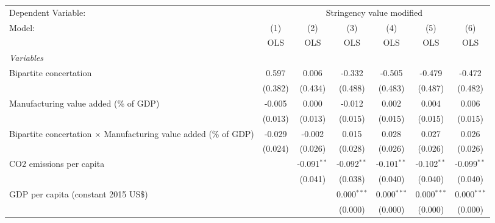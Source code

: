 
\begingroup
\centering
\begin{tabular}{lcccccc}
   \toprule
   Dependent Variable: & \multicolumn{6}{c}{Stringency value modified}\\
   Model:                                                                  & (1)     & (2)           & (3)           & (4)            & (5)            & (6)\\  
                                                                           &  OLS    & OLS           & OLS           & OLS            & OLS            & OLS\\  
   \midrule
   \emph{Variables}\\
   Bipartite concertation                                                  & 0.597   & 0.006         & -0.332        & -0.505         & -0.479         & -0.472\\   
                                                                           & (0.382) & (0.434)       & (0.488)       & (0.483)        & (0.487)        & (0.482)\\   
   Manufacturing value added (\% of GDP)                                   & -0.005  & 0.000         & -0.012        & 0.002          & 0.004          & 0.006\\   
                                                                           & (0.013) & (0.013)       & (0.015)       & (0.015)        & (0.015)        & (0.015)\\   
   Bipartite concertation $\times$ Manufacturing value added (\% of GDP)   & -0.029  & -0.002        & 0.015         & 0.028          & 0.027          & 0.026\\   
                                                                           & (0.024) & (0.026)       & (0.028)       & (0.026)        & (0.026)        & (0.026)\\   
   CO2 emissions per capita                                                &         & -0.091$^{**}$ & -0.092$^{**}$ & -0.101$^{**}$  & -0.102$^{**}$  & -0.099$^{**}$\\   
                                                                           &         & (0.041)       & (0.038)       & (0.040)        & (0.040)        & (0.040)\\   
   GDP per capita (constant 2015 US\$)                                     &         &               & 0.000$^{***}$ & 0.000$^{***}$  & 0.000$^{***}$  & 0.000$^{***}$\\   
                                                                           &         &               & (0.000)       & (0.000)        & (0.000)        & (0.000)\\   

\end{tabular}
